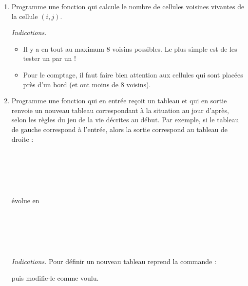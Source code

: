 \documentclass[11pt,class=report,crop=false]{standalone}
\begin{document}

\begin{activite}[Évolution]


\begin{enumerate}
  \item Programme une fonction  qui calcule le nombre de cellules voisines vivantes de la cellule $(i,j)$.
  
  \emph{Indications.}
  \begin{itemize}
    \item Il y a en tout au maximum $8$ voisins possibles. Le plus simple est de les tester un par un !
    \item Pour le comptage, il faut faire bien attention aux cellules qui sont placées près d'un bord (et ont moins de $8$ voisins).
  \end{itemize}
  
  \item Programme une fonction  qui en entrée reçoit un tableau et qui en sortie renvoie un nouveau tableau correspondant à la situation au jour d'après, selon les règles du jeu de la vie décrites au début.
 Par exemple, si le tableau de gauche correspond à l'entrée, alors la sortie correspond 
au tableau de droite :

\begin{center}
\begin{minipage}{0.3\textwidth}
\begin{center}
\\
\\
\\
\\
\end{center}
\end{minipage} 
 évolue en  
\begin{minipage}{0.3\textwidth}
\begin{center}
\\
\\
\\
\\
\end{center}
\end{minipage} 
\end{center}

  \emph{Indications.} Pour définir un nouveau tableau reprend la commande :\\    \centerline{}
  puis modifie-le comme voulu.

\end{enumerate}
\end{activite}
\end{document}
